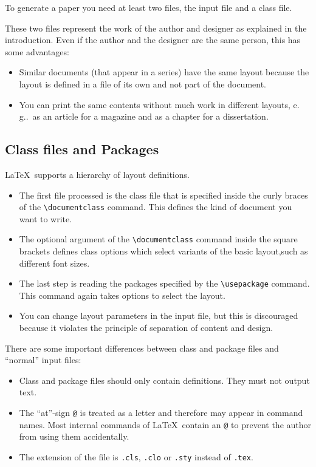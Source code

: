 \documentclass[twoside,a4paper]{refart}
\newcommand{\eg}{e.\,g..}
\begin{document}
To generate a paper you need at least two files, the input file and a 
class file.

These two files represent the work of the author and designer as 
explained in the introduction. Even if the author and the designer are 
the same person, this has some advantages:

\begin{itemize}
\item
        Similar documents (that appear in a series) have the same layout 
        because the layout is defined in a file of its own and not part of 
        the document.
\item
        You can print the same contents without much work in different 
        layouts, \eg\ as an article for a magazine and as a chapter for a 
        dissertation.
\end{itemize}

\subsection{Class files and Packages}

\LaTeX\ supports a hierarchy of layout definitions.
\begin{itemize}
\item
        The first file processed is the class file that is specified inside 
        the curly braces of the \verb|\documentclass| command. This 
        defines the kind of document you want to write. 
\item
        The optional argument of the \verb|\documentclass| command inside 
        the square brackets defines class options which select variants of 
        the basic layout,such as different font sizes.
\item
        The last step is reading the packages specified by the 
        \verb|\usepackage| command. This command again takes options to 
        select the layout.
\item
        You can change layout parameters in the input file, but this is 
        discouraged because it violates the principle of separation of 
        content and design.

\end{itemize}

There are some important differences between class and package files 
and ``normal'' input files:
\begin{itemize}
\item
        Class and package files should only contain definitions. They must 
        not output text.
\item
        The ``at''-sign \texttt{@} is treated as a letter and therefore may 
        appear in command names. Most internal commands of \LaTeX\ contain 
        an \texttt{@} to prevent the author from using them accidentally.
\item
        The extension of the file is \texttt{.cls}, \texttt{.clo} or 
        \texttt{.sty} instead of \texttt{.tex}.
\end{itemize}
\end{document}
